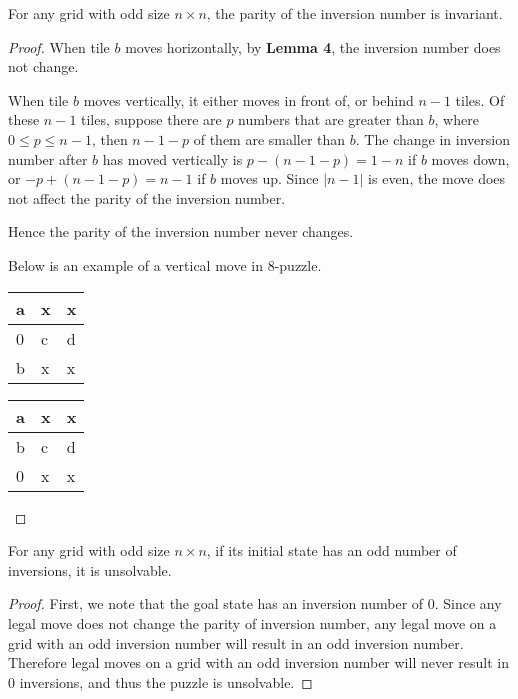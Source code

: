 \documentclass{llncs}
\begin{document}
\newpage

\begin{lemma}
For any grid with odd size $n \times n$, the parity of the inversion number is invariant.
\end{lemma}

\begin{proof}
When tile $b$ moves horizontally, by \textbf{Lemma 4}, the inversion number does not change.

When tile $b$ moves vertically, it either moves in front of, or behind $n - 1$ tiles. Of these $n - 1$ tiles, suppose there are $p$ numbers that are greater than $b$, where $0 \leq p \leq n - 1$, then $n - 1 - p$ of them are smaller than $b$. The change in inversion number after $b$ has moved vertically is $p-(n-1-p) = 1-n$ if $b$ moves down, or $-p + (n-1-p) = n-1$ if $b$ moves up. Since $|n-1|$ is even, the move does not affect the parity of the inversion number.

Hence the parity of the inversion number never changes.

Below is an example of a vertical move in $8$-puzzle.
\begin{table}
	\centering
	\label{tab3}
	\begin{tabular}{|p{2mm}|p{2mm}|p{2mm}|} \hline
	a & x & x\\ \hline
	0 & c & d\\ \hline
	b & x & x\\ \hline
	\end{tabular}
\end{table}
\begin{table}
	\centering
	\label{tab4}
	\begin{tabular}{|p{2mm}|p{2mm}|p{2mm}|} \hline
	a & x & x\\ \hline
	b & c & d\\ \hline
	0 & x & x\\ \hline
\end{tabular}
\end{table}
\end{proof}

\begin{lemma}
For any grid with odd size $n \times n$, if its initial state has an odd number of inversions, it is unsolvable.
\end{lemma}

\begin{proof}
First, we note that the goal state has an inversion number of $0$. Since any legal move does not change the parity of inversion number, any legal move on a grid with an odd inversion number will result in an odd inversion number. Therefore legal moves on a grid with an odd inversion number will never result in $0$ inversions, and thus the puzzle is unsolvable.
\end{proof}
\end{document}
